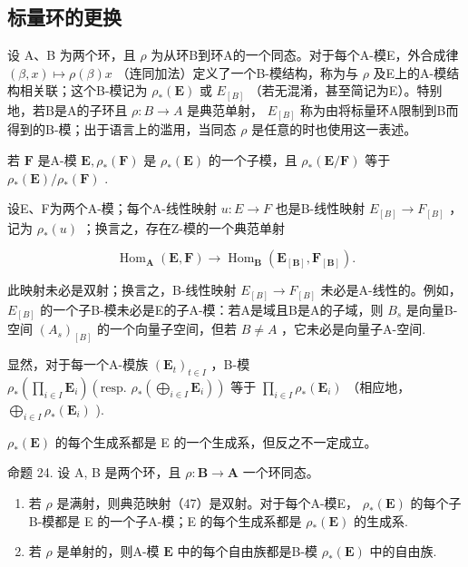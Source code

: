 \subsection{标量环的更换}

设 A、B 为两个环，且 \(\rho\) 为从环B到环A的一个同态。对于每个A-模E，外合成律 \((\beta, x) \mapsto \rho(\beta)x\) （连同加法）定义了一个B-模结构，称为与 \(\rho\) 及E上的A-模结构相关联；这个B-模记为 \(\rho_{*}(\mathbf{E})\) 或 \(E_{[B]}\) （若无混淆，甚至简记为E）。特别地，若B是A的子环且 \(\rho: B \to A\) 是典范单射， \(E_{[B]}\) 称为由将标量环A限制到B而得到的B-模；出于语言上的滥用，当同态 \(\rho\) 是任意的时也使用这一表述。

若 \(\mathbf{F}\) 是A-模 \(\mathbf{E},\rho_{*}(\mathbf{F})\) 是 \(\rho_{*}(\mathbf{E})\) 的一个子模，且 \(\rho_{*}(\mathbf{E} / \mathbf{F})\) 等于 \(\rho_{*}(\mathbf{E}) / \rho_{*}(\mathbf{F})\) .

设E、F为两个A-模；每个A-线性映射 \(u: E \rightarrow F\) 也是B-线性映射 \(E_{[B]} \rightarrow F_{[B]}\) ，记为 \(\rho_{*}(u)\) ；换言之，存在Z-模的一个典范单射

\[
\operatorname{Hom} _ {\mathbf {A}} (\mathbf {E}, \mathbf {F}) \rightarrow \operatorname{Hom} _ {\mathbf {B}} (\mathbf {E} _ {[ \mathbf {B} ]}, \mathbf {F} _ {[ \mathbf {B} ]}).\tag{47}
\]

此映射未必是双射；换言之，B-线性映射 \(E_{[B]} \rightarrow F_{[B]}\) 未必是A-线性的。例如， \(E_{[B]}\) 的一个子B-模未必是E的子A-模：若A是域且B是A的子域，则 \(B_{s}\) 是向量B-空间 \((A_{s})_{[B]}\) 的一个向量子空间，但若 \(B \neq A\) ，它未必是向量子A-空间.

显然，对于每一个A-模族 \((\mathbf{E}_t)_{t\in I}\) ，B-模 \(\rho_{*}\left(\prod_{i\in I}\mathbf{E}_{i}\right)\left(\text{resp. } \rho_{*}\left(\bigoplus_{i\in I}\mathbf{E}_{i}\right)\right)\) 等于 \(\prod_{i\in I}\rho_{*}(\mathbf{E}_{i})\) （相应地， \(\bigoplus_{i\in I}\rho_{*}(\mathbf{E}_{i})\) ).

\(\rho_{*}(\mathbf{E})\) 的每个生成系都是 E 的一个生成系，但反之不一定成立。

命题 24. 设 A, B 是两个环，且 \(\rho: \mathbf{B} \to \mathbf{A}\) 一个环同态。

\begin{enumerate}
\def\labelenumi{(\roman{enumi})}
\item
  若 \(\rho\) 是满射，则典范映射（47）是双射。对于每个A-模E， \(\rho_{*}(\mathbf{E})\) 的每个子B-模都是 E 的一个子A-模；E 的每个生成系都是 \(\rho_{*}(\mathbf{E})\) 的生成系.
\item
  若 \(\rho\) 是单射的，则A-模 \(\mathbf{E}\) 中的每个自由族都是B-模 \(\rho_{*}(\mathbf{E})\) 中的自由族.
\end{enumerate}

